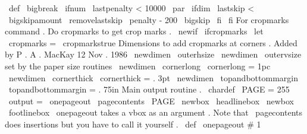 \
def
\
bigbreak
{
\
ifnum
\
lastpenalty
<
10000
\
par
\
ifdim
\
lastskip
<
\
bigskipamount
\
removelastskip
\
penalty
-
200
\
bigskip
\
fi
\
fi
}
%
For
cropmarks
command
.
%
Do
cropmarks
to
get
crop
marks
.
%
\
newif
\
ifcropmarks
\
let
\
cropmarks
=
\
cropmarkstrue
%
%
Dimensions
to
add
cropmarks
at
corners
.
%
Added
by
P
.
A
.
MacKay
12
Nov
.
1986
%
\
newdimen
\
outerhsize
\
newdimen
\
outervsize
%
set
by
the
paper
size
routines
\
newdimen
\
cornerlong
\
cornerlong
=
1pc
\
newdimen
\
cornerthick
\
cornerthick
=
.
3pt
\
newdimen
\
topandbottommargin
\
topandbottommargin
=
.
75in
%
Main
output
routine
.
\
chardef
\
PAGE
=
255
\
output
=
{
\
onepageout
{
\
pagecontents
\
PAGE
}
}
\
newbox
\
headlinebox
\
newbox
\
footlinebox
%
\
onepageout
takes
a
vbox
as
an
argument
.
Note
that
\
pagecontents
%
does
insertions
but
you
have
to
call
it
yourself
.
\
def
\
onepageout
#
1
